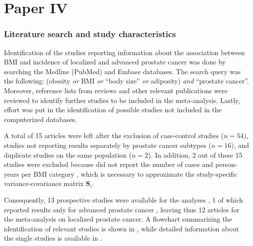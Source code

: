 %

\section{Paper IV}

\subsubsection{Literature search and study characteristics}

Identification of the studies reporting information about the association between BMI and incidence of localized and advanced prostate cancer was done by searching the Medline (PubMed) and Embase databases. The search query was the following: (obesity \textit{or} BMI \textit{or} ``body size'' \textit{or} adiposity) \textit{and} ``prostate cancer''. Moreover, reference lists from reviews and other relevant publications were reviewed to identify further studies to be included in the meta-analysis. Lastly, effort was put in the identification of possible studies not included in the computerized databases. %

A total of 15 articles were left after the exclusion of case-control studies ($n=54$), studies not reporting results separately by prostate cancer subtypes ($n=16$), and duplicate studies on the same population ($n=2$). In addition, 2 out of these 15 studies were excluded because did not report the number of cases and person-years per BMI category \citep{habel_body_2000, gong_obesity_2006}, which is necessary to approximate the study-specific variance-covariance matrix $\mathbf{S}_i$. 

Consequently, 13 prospective studies were available for the analyses \citep{cerhan_association_1997, giovannucci_height_1997, putnam_lifestyle_2000, schuurman_anthropometry_2000, macinnis_body_2003, kurahashi_association_2006, littman_anthropometrics_2007, rodriguez_body_2007, wright_prospective_2007, pischon_body_2008, wallstrom_prospective_2009, stocks_blood_2010, discacciati_body_2011}, 1 of which reported results only for advanced prostate cancer \citep{giovannucci_height_1997}, leaving thus 12 articles for the meta-analysis on localized prostate cancer. A flowchart summarizing the identification of relevant studies is shown in  , while detailed information about the single studies is available in .

